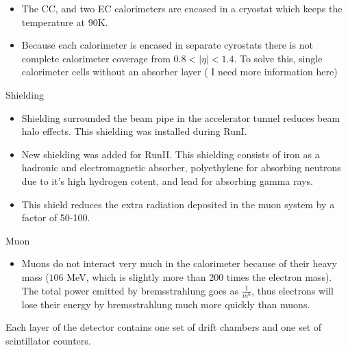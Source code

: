 \begin{itemize}
\item The CC, and two EC calorimeters are encased in a cryostat which keeps the temperature at 90K.
\item Because each calorimeter is encased in separate cyrostats there is not complete calorimeter coverage from $0.8 < |\eta| < 1.4$. To solve this, single calorimeter cells without an absorber layer ( I need more information here) 
\end{itemize}


Shielding
\begin{itemize}
\item Shielding surrounded the beam pipe in the accelerator tunnel reduces beam halo effects. This shielding was installed during RunI.
\item New shielding was added for RunII. This shielding consists of iron as a hadronic and electromagnetic absorber, polyethylene for absorbing neutrons due to it's high hydrogen cotent, and lead for absorbing gamma rays.
\item This shield reduces the extra radiation deposited in the muon system by a factor of 50-100.

\end{itemize}


Muon
\begin{itemize}
\item Muons do not interact very much in the calorimeter because of their heavy mass ($106$ MeV, which is slightly more than 200 times the electron mass). The total power emitted by bremsstrahlung goes as $\frac{1}{m^{6}}$, thus electrons will lose their energy by bremsstrahlung much more quickly than muons.
\end{itemize}




Each layer of the detector contains one set of drift chambers and one set of scintillator counters. 

